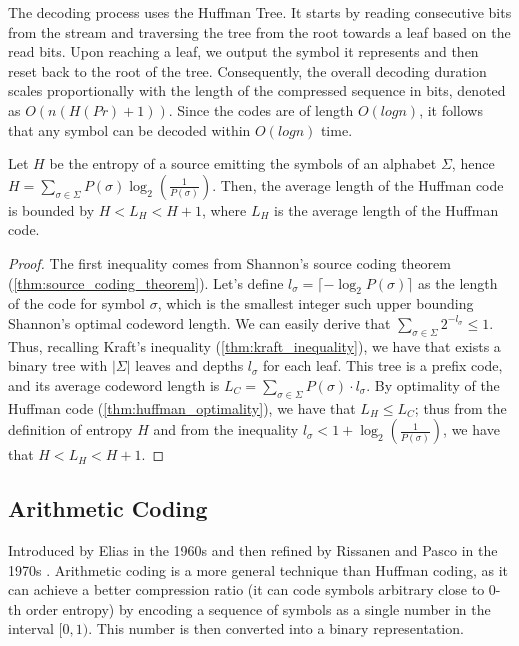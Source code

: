 The decoding process uses the Huffman Tree. It starts by reading consecutive bits from the stream and traversing the tree from the root towards a leaf based on the read bits. Upon reaching a leaf, we output the symbol it represents and then reset back to the root of the tree. Consequently, the overall decoding duration scales proportionally with the length of the compressed sequence in bits, denoted as $O(n(H(Pr) + 1))$. Since the codes are of length $O(log n)$, it follows that any symbol can be decoded within $O(log n)$ time.

\begin{theorem}
    Let $H$ be the entropy of a source emitting the symbols of an alphabet $\Sigma$, hence $H = \sum_{\sigma \in \Sigma} P(\sigma)\log_2\left(\frac{1}{P(\sigma)}\right)$. Then, the average length of the Huffman code is bounded by $H < L_H < H + 1$, where $L_H$ is the average length of the Huffman code.
\end{theorem}
\begin{proof}
    The first inequality comes from Shannon's source coding theorem (\autoref{thm:source_coding_theorem}). Let's define $l_\sigma = \lceil -\log_2 P(\sigma) \rceil$ as the length of the code for symbol $\sigma$, which is the smallest integer such upper bounding Shannon's optimal codeword length. We can easily derive that $\sum_{\sigma \in \Sigma} 2^{-l_\sigma} \leq 1$. Thus, recalling Kraft's inequality (\autoref{thm:kraft_inequality}), we have that exists a binary tree with $|\Sigma|$ leaves and depths $l_\sigma$ for each leaf. This tree is a prefix code, and its average codeword length is $L_C = \sum_{\sigma \in \Sigma} P(\sigma) \cdot l_\sigma$. By optimality of the Huffman code (\ref{thm:huffman_optimality}), we have that $L_H \leq L_C$; thus from the definition of entropy $H$ and from the inequality $l_\sigma < 1 + \log_2\left(\frac{1}{P(\sigma)}\right)$, we have that $H < L_H < H + 1$.
\end{proof}


\subsection{Arithmetic Coding}

Introduced by Elias in the 1960s and then refined by Rissanen and Pasco in the 1970s \cite{pasco1976source}. Arithmetic coding is a more general technique than Huffman coding, as it can achieve a better compression ratio (it can code symbols arbitrary close to 0-th order entropy) by encoding a sequence of symbols as a single number in the interval $[0,1)$. This number is then converted into a binary representation. \vspace{0.4cm}

